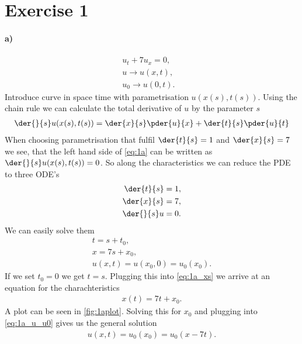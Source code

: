\section{Exercise 1}
\paragraph{a)}\label{par:a}
\begin{align}
u_t + 7u_x=0,&\label{eq:1a}\\
u \rightarrow u(x,t),&\\
u_0 \rightarrow u(0,t).&
\end{align}
Introduce curve in space time with parametrisation $u(x(s),t(s))$. Using the chain rule we can calculate the total derivative of $u$  by the parameter $s$
\begin{align}
\der{}{s}u(x(s),t(s)) = \der{x}{s}\pder{u}{x} + \der{t}{s}\pder{u}{t}
\end{align}
When choosing parametrisation that fulfil $\der{t}{s} = 1$ and $\der{x}{s}=7$ we see, that the left hand side  of  \cref{eq:1a} can be written as $\der{}{s}u(x(s),t(s))=0$.
So along the characteristics we can reduce the  PDE to three ODE's 
\begin{align}
\der{t}{s} &= 1,\\
\der{x}{s}&=7,\\
\der{}{s}u&=0.
\end{align}
We can easily solve them
\begin{align}
t=s +t_0,\\
x = 7s + x_0,\label{eq:1a_xs}\\
u(x,t) = u(x_0, 0) =u_0(x_0)\label{eq:1a_u_u0} .
\end{align}
If we set $t_0=0$ we get $t=s$. Plugging this into \cref{eq:1a_xs} we arrive at an equation for the charachteristics 
\begin{align}
x(t) = 7t + x_0.\label{eq:1a_charch_curve}
\end{align}
A plot can be seen in \cref{fig:1aplot}.
Solving this for $x_0$ and plugging into \cref{eq:1a_u_u0} gives us the general solution
\begin{align}
u(x,t)=u_0(x_0)=u_0(x-7t).
\end{align}

